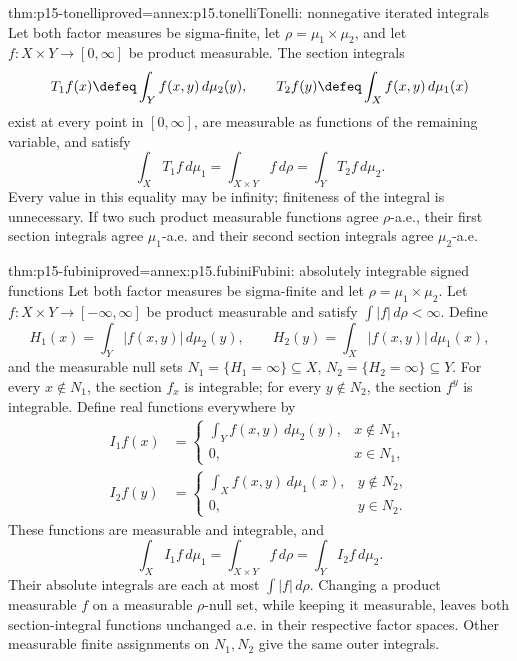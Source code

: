 \begin{hbtheorem}{thm:p15-tonelli}{proved=annex:p15.tonelli}{Tonelli: nonnegative iterated integrals}
Let both factor measures be sigma-finite, let
\(\rho=\mu_1\times\mu_2\), and let
\(f:X\times Y\to[0,\infty]\) be product measurable.
The section integrals
\[
 T_1f(x)\defeq\int_Y f(x,y)\,d\mu_2(y),\qquad
 T_2f(y)\defeq\int_X f(x,y)\,d\mu_1(x)
\]
exist at every point in \([0,\infty]\), are measurable as functions
of the remaining variable, and satisfy
\[
 \int_X T_1f\,d\mu_1
       =\int_{X\times Y}f\,d\rho
       =\int_Y T_2f\,d\mu_2.
\]
Every value in this equality may be infinity; finiteness of the integral
is unnecessary. If two such product measurable functions agree
\(\rho\)-a.e., their first section integrals agree
\(\mu_1\)-a.e. and their second section integrals agree
\(\mu_2\)-a.e.
\end{hbtheorem}

\begin{hbtheorem}{thm:p15-fubini}{proved=annex:p15.fubini}{Fubini: absolutely integrable signed functions}
Let both factor measures be sigma-finite and let
\(\rho=\mu_1\times\mu_2\). Let
\(f:X\times Y\to[-\infty,\infty]\) be product measurable
and satisfy \(\int|f|\,d\rho<\infty\). Define
\[
 H_1(x)=\int_Y|f(x,y)|\,d\mu_2(y),\qquad
 H_2(y)=\int_X|f(x,y)|\,d\mu_1(x),
\]
and the measurable null sets \(N_1=\{H_1=\infty\}\subseteq X\),
\(N_2=\{H_2=\infty\}\subseteq Y\). For every \(x\notin N_1\),
the section \(f_x\) is integrable; for every \(y\notin N_2\),
the section \(f^y\) is integrable. Define real functions everywhere by
\[
 \begin{aligned}
 I_1f(x)&=\begin{cases}
  \int_Y f(x,y)\,d\mu_2(y),&x\notin N_1,\\
  0,&x\in N_1,
 \end{cases}\\
 I_2f(y)&=\begin{cases}
  \int_X f(x,y)\,d\mu_1(x),&y\notin N_2,\\
  0,&y\in N_2.
 \end{cases}
 \end{aligned}
\]
These functions are measurable and integrable, and
\[
 \int_X I_1f\,d\mu_1
       =\int_{X\times Y}f\,d\rho
       =\int_Y I_2f\,d\mu_2.
\]
Their absolute integrals are each at most \(\int|f|\,d\rho\).
Changing a product measurable \(f\) on a measurable \(\rho\)-null
set, while keeping it measurable, leaves both section-integral functions
unchanged a.e. in their respective factor spaces. Other measurable
finite assignments on \(N_1,N_2\) give the same outer integrals.
\end{hbtheorem}

